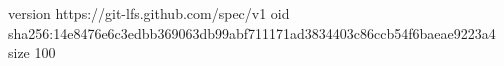 version https://git-lfs.github.com/spec/v1
oid sha256:14e8476e6c3edbb369063db99abf711171ad3834403c86ccb54f6baeae9223a4
size 100
